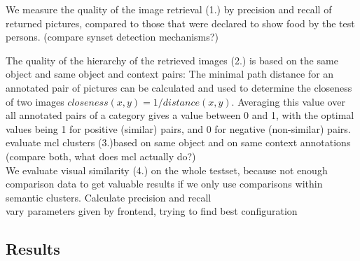 We measure the quality of the image retrieval (1.) by precision and recall of returned pictures, compared to those that were declared to show food by the test persons. (compare synset detection mechanisms?) 

The quality of the hierarchy of the retrieved images (2.) is based on the same object and same object and context pairs: The  minimal path distance for an annotated pair of pictures can be calculated and used to determine the closeness of two images $closeness(x,y) = 1/distance(x,y)$. Averaging this value over all annotated pairs of a category gives a value between 0 and 1, with the optimal values being 1 for positive (similar) pairs, and 0 for negative (non-similar) pairs.\\
evaluate mcl clusters (3.)based on same object and on same context annotations (compare both, what does mcl actually do?) \\

We evaluate visual similarity (4.) on the whole testset, because not enough comparison data to get valuable results if we only use comparisons within semantic clusters. Calculate precision and recall\\

vary parameters given by frontend, trying to find best configuration \\

\subsection{Results}

